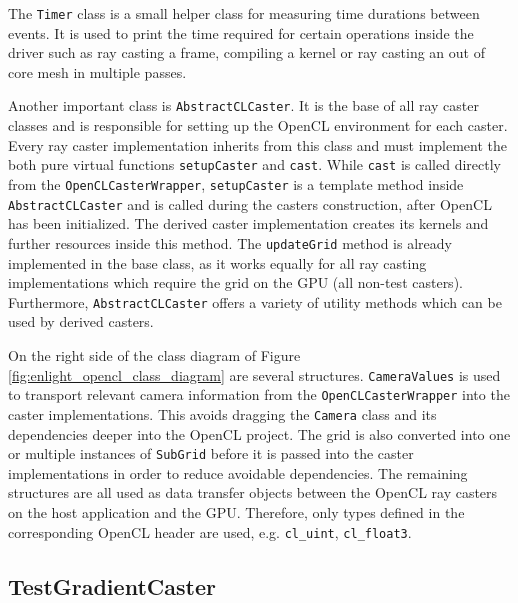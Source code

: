 The \lstinline!Timer! class is a small helper class for measuring time durations between events. It is used to print the time required for certain operations inside the driver such as ray casting a frame, compiling a kernel or ray casting an out of core mesh in multiple passes.

Another important class is \lstinline!AbstractCLCaster!. It is the base of all ray caster classes and is responsible for setting up the OpenCL environment for each caster. Every ray caster implementation inherits from this class and must implement the both pure virtual functions \lstinline!setupCaster! and \lstinline!cast!. While \lstinline!cast! is called directly from the \lstinline!OpenCLCasterWrapper!, \lstinline!setupCaster! is a template method inside \lstinline!AbstractCLCaster! and is called during the casters construction, after OpenCL has been initialized. The derived caster implementation creates its kernels and further resources inside this method. The \lstinline!updateGrid! method is already implemented in the base class, as it works equally for all ray casting implementations which require the grid on the GPU (all non-test casters). Furthermore, \lstinline!AbstractCLCaster! offers a variety of utility methods which can be used by derived casters.

On the right side of the class diagram of Figure \ref{fig:enlight_opencl_class_diagram} are several structures. \lstinline!CameraValues! is used to transport relevant camera information from the \lstinline!OpenCLCasterWrapper! into the caster implementations. This avoids dragging the \lstinline!Camera! class and its dependencies deeper into the OpenCL project. The grid is also converted into one or multiple instances of \lstinline!SubGrid! before it is passed into the caster implementations in order to reduce avoidable dependencies. The remaining structures are all used as data transfer objects between the OpenCL ray casters on the host application and the GPU. Therefore, only types defined in the corresponding OpenCL header are used, e.g. \lstinline!cl_uint!, \lstinline!cl_float3!. 


\subsection{TestGradientCaster}

